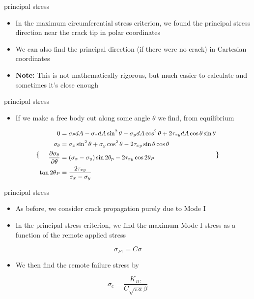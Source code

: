 \documentclass[
  letterpaper,
  ignorenonframetext,
  aspectratio=43,
  handout,
  12pt]{beamer}
\providecommand{\tightlist}{%
  \setlength{\itemsep}{0pt}\setlength{\parskip}{0pt}}
\providecommand{\tightlist}{%
\setlength{\itemsep}{0pt}\setlength{\parskip}{0pt}}
\begin{document}
\begin{frame}{principal stress}
\protect\hypertarget{principal-stress}{}
\begin{itemize}
\tightlist
\item
  In the maximum circumferential stress criterion, we found the
  principal stress direction near the crack tip in polar coordinates
\item
  We can also find the principal direction (if there were no crack) in
  Cartesian coordinates
\item
  \textbf{Note:} This is not mathematically rigorous, but much easier to
  calculate and sometimes it's close enough
\end{itemize}
\end{frame}

\begin{frame}{principal stress}
\protect\hypertarget{principal-stress-1}{}
\begin{itemize}
\tightlist
\item
  If we make a free body cut along some angle \(\theta\) we find, from
  equilibrium
\end{itemize}

\[\small\{\begin{aligned}
      \begin{split}
  0 &= \sigma_\theta dA - \sigma_x dA \sin^2 \theta - \sigma_y dA \cos^2 \theta + 2\tau_{xy} dA \cos \theta \sin \theta\\
  \sigma_\theta &= \sigma_x \sin^2 \theta + \sigma_y \cos^2 \theta - 2 \tau_{xy} \sin \theta \cos \theta\\
  \frac{\partial \sigma_\theta}{\partial \theta} &= (\sigma_x - \sigma_y) \sin 2\theta_p - 2\tau_{xy} \cos 2\theta_P\\
  \tan 2\theta_P &= \frac{2 \tau_{xy}}{\sigma_x - \sigma_y}
  \end{split}
\end{aligned}\}\]
\end{frame}

\begin{frame}{principal stress}
\protect\hypertarget{principal-stress-2}{}
\begin{itemize}
\tightlist
\item
  As before, we consider crack propagation purely due to Mode I
\item
  In the principal stress criterion, we find the maximum Mode I stress
  as a function of the remote applied stress
\end{itemize}

\[\sigma_{P1} = C\sigma\]

\begin{itemize}
\tightlist
\item
  We then find the remote failure stress by
\end{itemize}

\[\sigma_c = \frac{K_{IC}}{C\sqrt{\pi a}\beta}\]
\end{frame}
\end{document}
